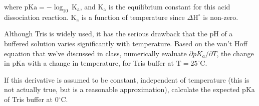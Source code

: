 \documentclass[12pt]{article}
\begin{document}
where $\mathrm{pKa}=-\log _{10} \mathrm{~K}_{\mathrm{a}}$, and $\mathrm{K}_{\mathrm{a}}$ is the equilibrium constant for this acid dissociation reaction. $\mathrm{K}_{\mathrm{a}}$ is a function of temperature since $\Delta \mathrm{H}^{\circ}$ is non-zero.

Although Tris is widely used, it has the serious drawback that the $\mathrm{pH}$ of a buffered solution varies significantly with temperature. Based on the van't Hoff equation that we've discussed in class, numerically evaluate $\partial p K_{a} / \partial T$, the change in pKa with a change in temperature, for Tris buffer at $\mathrm{T}=25^{\circ} \mathrm{C}$.

If this derivative is assumed to be constant, independent of temperature (this is not actually true, but is a reasonable approximation), calculate the expected pKa of Tris buffer at $0{ }^{\circ} \mathrm{C}$.
\end{document}
